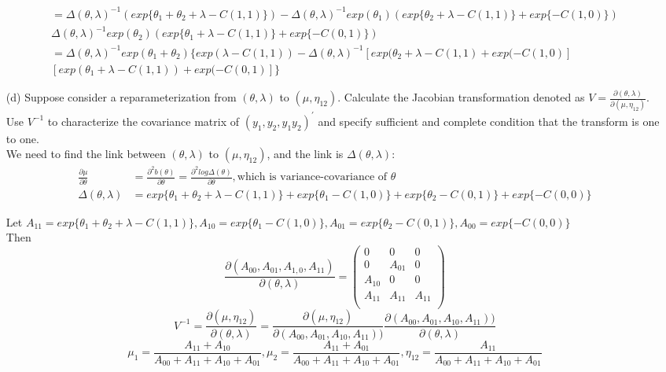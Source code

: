 \documentclass{homework}
\begin{document}
\begin{itemize}
    
    \begin{equation}
    \begin{split}
=   \Delta(\theta, \lambda)^{-1} (exp\{\theta_1 + \theta_2+ \lambda - C(1,1)\}) 
       - \Delta(\theta, \lambda)^{-1} exp(\theta_1)(exp\{\theta_2 + \lambda - C(1,1)\} + exp\{- C(1,0)\})\\
       \Delta(\theta, \lambda)^{-1} exp(\theta_2)(exp\{\theta_1 + \lambda - C(1,1)\} + exp\{- C(0,1)\})\\
       =\Delta(\theta, \lambda)^{-1}exp(\theta_1+\theta_2)\{ exp(\lambda - C(1,1))
       - \Delta(\theta, \lambda)^{-1} [exp(\theta_2+\lambda - C(1,1)+ exp(-C(1,0)]\\
       [exp(\theta_1+\lambda - C(1,1))+ exp(-C(0,1)] \}
\end{split}
\end{equation}
\item[(d)] Suppose consider a reparameterization from $(\theta,\lambda)$ to $(\mu,\eta_{12})$. Calculate the Jacobian transformation denoted as $V = \frac{\partial(\theta, \lambda)}{\partial(\mu, \eta_{12})}$. Use $V^{-1}$ to characterize the covariance matrix of $(y_1, y_2, y_1y_2)^{'}$ and specify sufficient and complete condition that the transform is one to one. \\
We need to find the link between $(\theta,\lambda)$ to $(\mu,\eta_{12})$, and the link is $\Delta(\theta, \lambda)$:\\
\begin{align*}
\frac{\partial \mu}{\partial \theta} &= \frac{\partial^2 b(\theta)}{\partial \theta} = \frac{\partial^2 log \Delta(\theta)}{\partial \theta}, \text{which is variance-covariance of } \theta\\
     \Delta(\theta, \lambda) &= exp\{\theta_1 + \theta_2 + \lambda - C(1,1)\} + exp\{\theta_1 - C(1,0)\}   + exp\{\theta_2 - C(0,1)\} + exp\{- C(0,0)\}
\end{align*}

    Let  $A_{11} = exp\{\theta_1 + \theta_2 + \lambda - C(1,1)\},  A_{10} = exp\{\theta_1 - C(1,0)\}, A_{01} =exp\{\theta_2 - C(0,1)\}, A_{00} =exp\{- C(0,0)\}$\\
    Then
     \[
      \frac{\partial (A_{00},A_{01},A_{1,0},A_{11})}{\partial (\theta,\lambda) } = 
      \begin{pmatrix}
  0 & 0 & 0 \\ 
  0 & A_{01} & 0 \\
  A_{10} & 0 & 0 \\
  A_{11} & A_{11} & A_{11}\\
\end{pmatrix}
    \] 
 \[
       V^{-1} = \frac{\partial (\mu,\eta_{12})}{\partial (\theta,\lambda) } = \frac{\partial (\mu,\eta_{12})}{\partial (A_{00},A_{01},A_{10},A_{11})) } \frac{\partial (A_{00},A_{01},A_{10},A_{11}))}{\partial (\theta,\lambda) }
    \]
    \[
       \mu_1 = \frac{A_{11} + A_{10}}{A_{00}+ A_{11} + A_{10}+ A_{01}}, \mu_2 = \frac{A_{11} + A_{01}}{A_{00}+ A_{11} + A_{10}+ A_{01}}, \eta_{12} = \frac{A_{11}}{A_{00}+ A_{11} + A_{10}+ A_{01}} 
    \]
    

\end{itemize}
\end{document}

